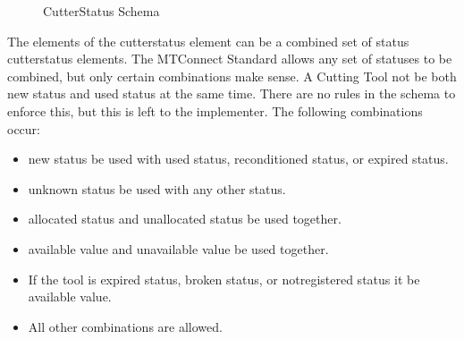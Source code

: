 \documentclass{mtconnect}	%
\begin{document}
\begin{figure}[ht]
  \centering
  \caption{CutterStatus Schema}
  \label{fig:cutterstatus-schema}
\end{figure}

\FloatBarrier

The elements of the \gls{cutterstatus} element can be a combined set of \gls{status cutterstatus} elements.  The MTConnect Standard allows any set of statuses to be combined, but only certain combinations make sense.  A Cutting Tool \SHOULD not be both \gls{new status} and \gls{used status} at the same time.  There are no rules in the schema to enforce this, but this is left to the implementer.  The following combinations \MUSTNOT occur: 

\begin{itemize}
    \item \gls{new status} \MUSTNOT be used with \gls{used status}, \gls{reconditioned status}, or \gls{expired status}.
    \item \gls{unknown status} \MUSTNOT be used with any other status. 
    \item \gls{allocated status} and \gls{unallocated status} \MUSTNOT be used together.
    \item \gls{available value} and \gls{unavailable value} \MUSTNOT be used together.
    \item If the tool is \gls{expired status}, \gls{broken status}, or \gls{notregistered status} it \MUSTNOT be \gls{available value}.
    \item All other combinations are allowed.
\end{itemize}
\end{document}
